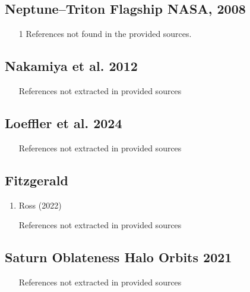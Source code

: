 \documentclass[12pt]{article}
\begin{document}
\subsection*{Neptune–Triton Flagship NASA, 2008}
\begin{enumerate}
\item [1] References not found in the provided sources.
\end{enumerate}

\subsection*{Nakamiya et al. 2012}
\begin{enumerate}
\item [References not extracted in provided sources]
\end{enumerate}

\subsection*{Loeffler et al. 2024}
\begin{enumerate}
\item [References not extracted in provided sources]
\end{enumerate}

\subsection*{Fitzgerald}
\begin{enumerate}
\item Ross (2022)
\item [References not extracted in provided sources]
\end{enumerate}

\subsection*{Saturn Oblateness Halo Orbits 2021}
\begin{enumerate}
\item [References not extracted in provided sources]
\end{enumerate}
\end{document}
